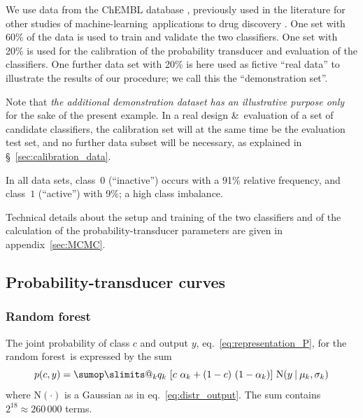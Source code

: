 \documentclass[\ifafour a4paper,12pt,\else a5paper,10pt,\fi%
onecolumn,oneside,article,%
british%
]{memoir}
\makeatletter
\theoremstyle{remark}
\theoremstyle{innote}
\def\sum{\DOTSI\sumop\slimits@}
\newcommand*{\amp}{\&}
\DeclarePairedDelimiter\clcl{[}{]}
\renewcommand*{\|}[1][]{\nonscript\:#1\vert\nonscript\:\mathopen{}}
\newcommand*{\sect}{\S}%
\newcommand*{\eqn}{eq.}%
\newcommand*{\cf}{{cf.}}
\newcommand*{\ml}{machine-learning}
\newcommand*{\RF}{random forest}
\newcommand*{\No}{\mathrm{N}}
\makeatother
\begin{document}
We use data from the ChEMBL database \autocites{bentoetal2014}, previously used in the literature for other studies of \ml\ applications to drug discovery \autocites{koutsoukasetal2017}. One set with 60\% of the data is used to train and validate the two classifiers. One set with 20\% is used for the calibration of the probability transducer and evaluation of the classifiers. One further data set with 20\% is here used as fictive \enquote{real data} to illustrate the results of our procedure; we call this the \enquote{demonstration set}.

Note that \emph{the additional demonstration dataset has an illustrative purpose only} for the sake of the present example. In a real design \amp\ evaluation of a set of candidate classifiers, the calibration set will at the same time be the evaluation test set, and no further data subset will be necessary, as explained in \sect~\ref{sec:calibration_data}.

In all data sets, class~$0$ (\enquote{inactive}) occurs with a 91\% relative frequency, and class~$1$ (\enquote{active}) with 9\%; a high class imbalance.

Technical details about the setup and training of the two classifiers and of the calculation of the probability-transducer parameters are given in appendix~\ref{sec:MCMC}.



\subsection{Probability-transducer curves}
\label{sec:demo_curves}

\subsubsection{Random forest}
\label{sec:curve_RF}

The joint probability of class $c$ and output $y$, \eqn~\eqref{eq:representation_P}, for the \RF\ is expressed by the sum
\begin{equation}
  \label{eq:P_c_out_RF}
  p(c, y) = \sum_{k} q_{k}\
  [c\ \alpha_{k} + (1-c)\ (1-\alpha_{k})]\ 
  \No(y \| \mu_{k}, \sigma_{k})
\end{equation}
where $\No(\cdot)$ is a Gaussian as in \eqn~\eqref{eq:distr_output}. The sum contains $2^{18} \approx 260\,000$ terms.
\end{document}
